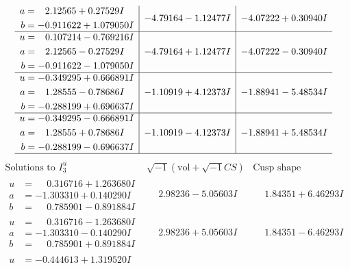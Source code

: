 \documentclass[1p]{elsarticle_modified}
\theoremstyle{definition}
\newcommand{\I}{\sqrt{-1}}
\begin{document}
$$\begin{array}{c|c|c}
\begin{aligned}
a &= \phantom{-}2.12565 + 0.27529 I \\
b &= -0.911622 + 1.079050 I\end{aligned}
 & -4.79164 - 1.12477 I & -4.07222 + 0.30940 I \\ \hline\begin{aligned}
u &= \phantom{-}0.107214 - 0.769216 I \\
a &= \phantom{-}2.12565 - 0.27529 I \\
b &= -0.911622 - 1.079050 I\end{aligned}
 & -4.79164 + 1.12477 I & -4.07222 - 0.30940 I \\ \hline\begin{aligned}
u &= -0.349295 + 0.666891 I \\
a &= \phantom{-}1.28555 - 0.78686 I \\
b &= -0.288199 + 0.696637 I\end{aligned}
 & -1.10919 + 4.12373 I & -1.88941 - 5.48534 I \\ \hline\begin{aligned}
u &= -0.349295 - 0.666891 I \\
a &= \phantom{-}1.28555 + 0.78686 I \\
b &= -0.288199 - 0.696637 I\end{aligned}
 & -1.10919 - 4.12373 I & -1.88941 + 5.48534 I\\
 \hline 
 \end{array}$$\newpage$$\begin{array}{c|c|c}  
\text{Solutions to }I^u_{3}& \I (\text{vol} + \sqrt{-1}CS) & \text{Cusp shape}\\
 \hline 
\begin{aligned}
u &= \phantom{-}0.316716 + 1.263680 I \\
a &= -1.303310 + 0.140290 I \\
b &= \phantom{-}0.785901 - 0.891884 I\end{aligned}
 & \phantom{-}2.98236 - 5.05603 I & \phantom{-}1.84351 + 6.46293 I \\ \hline\begin{aligned}
u &= \phantom{-}0.316716 - 1.263680 I \\
a &= -1.303310 - 0.140290 I \\
b &= \phantom{-}0.785901 + 0.891884 I\end{aligned}
 & \phantom{-}2.98236 + 5.05603 I & \phantom{-}1.84351 - 6.46293 I \\ \hline\begin{aligned}
u &= -0.444613 + 1.319520 I \\

\end{aligned}
\end{array}$$
\end{document}
